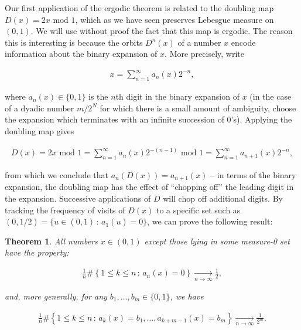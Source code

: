 \documentclass[11pt]{report}
\theoremstyle{plain}
\newtheorem{thm}{Theorem}[chapter]
\theoremstyle{definition}
\begin{document}
Our first application of the ergodic theorem is
related to the doubling map $D(x)=2x\textrm{ mod }1$,
which as we have seen preserves Lebesgue measure on
$(0,1)$. We will use without proof the fact that this
map is ergodic. The reason this is interesting is
because the orbits $D^n(x)$ of a number $x$ encode
information about the binary expansion of $x$. More
precisely, write

\begin{align*}
x = \sum_{n=1}^\infty a_n(x) 2^{-n},
\end{align*}

\noindent where $a_n(x) \in \{0,1\}$ is the $n$th digit in the
binary expansion of $x$ (in the case of a dyadic
number $m/2^N$ for which there is a small amount of
ambiguity, choose the expansion which terminates with
an infinite succession of $0$'s). Applying the
doubling map gives

\begin{align*}
D(x) = 2x\textrm{ mod 1} = \sum_{n=1}^\infty a_n(x) 2^{-(n-1)} \textrm{ mod }1 = \sum_{n=1}^\infty a_{n+1}(x)2^{-n},
\end{align*}

\noindent from which we conclude that $a_n(D(x)) = a_{n+1}(x)$
-- in terms of the binary expansion, the doubling map
has the effect of ``chopping off'' the leading digit
in the expansion. Successive applications of $D$ will
chop off additional digits. By tracking the frequency
of visits of $D(x)$ to a specific set such as
$(0,1/2) = \{ u\in(0,1)\,:\, a_1(u)=0 \}$, we can
prove the following result:

\begin{thm}
All numbers $x\in(0,1)$ except those lying in some
measure-0 set have the property:

\begin{equation*} \tag{35}\label{eq:normal1}
\begin{split}
\frac{1}{n}\#\left\{ 1\le k\le n\,:\, a_n(x) = 0 \right\} \xrightarrow[n\to\infty]{} \tfrac12,
\end{split}
\end{equation*}

\noindent and, more generally, for any
$b_1,\ldots,b_m\in\{0,1\}$, we have

\begin{equation*} \tag{36}\label{eq:normal2}
\begin{split}
\frac{1}{n}\#\left\{ 1\le k\le n\,:\, a_k(x) = b_1,\ldots, a_{k+m-1}(x)=b_m \right\} \xrightarrow[n\to\infty]{} \frac{1}{2^m}.
\end{split}
\end{equation*}

\end{thm}
\end{document}
